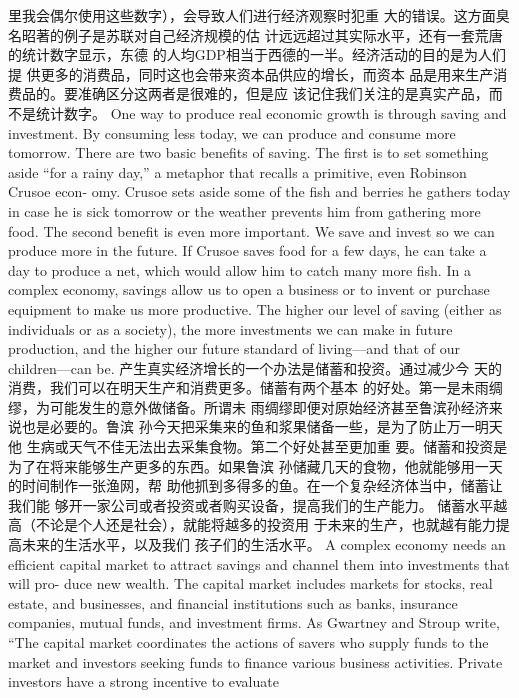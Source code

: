 \begin{paracol}{2}
里我会偶尔使用这些数字），会导致人们进行经济观察时犯重
大的错误。这方面臭名昭著的例子是苏联对自己经济规模的估
计远远超过其实际水平，还有一套荒唐的统计数字显示，东德
的人均GDP相当于西德的一半。经济活动的目的是为人们提
供更多的消费品，同时这也会带来资本品供应的增长，而资本
品是用来生产消费品的。要准确区分这两者是很难的，但是应
该记住我们关注的是真实产品，而不是统计数字。
\switchcolumn*
One way to produce real economic growth is through saving
and investment. By consuming less today, we can produce and
consume more tomorrow. There are two basic benefits of saving. The first is to set something aside ``for a rainy day,'' a
metaphor that recalls a primitive, even Robinson Crusoe econ-
omy. Crusoe sets aside some of the fish and berries he gathers
today in case he is sick tomorrow or the weather prevents him
from gathering more food. The second benefit is even more important. We save and invest so we can produce more in the future. If Crusoe saves food for a few days, he can take a day to
produce a net, which would allow him to catch many more fish.
In a complex economy, savings allow us to open a business or to
invent or purchase equipment to make us more productive. The
higher our level of saving (either as individuals or as a society),
the more investments we can make in future production, and
the higher our future standard of living---and that of our children---can be.
\switchcolumn
产生真实经济增长的一个办法是储蓄和投资。通过减少今
天的消费，我们可以在明天生产和消费更多。储蓄有两个基本
的好处。第一是未雨绸缪，为可能发生的意外做储备。所谓未
雨绸缪即便对原始经济甚至鲁滨孙经济来说也是必要的。鲁滨
孙今天把采集来的鱼和浆果储备一些，是为了防止万一明天他
生病或天气不佳无法出去采集食物。第二个好处甚至更加重
要。储蓄和投资是为了在将来能够生产更多的东西。如果鲁滨
孙储藏几天的食物，他就能够用一天的时间制作一张渔网，帮
助他抓到多得多的鱼。在一个复杂经济体当中，储蓄让我们能
够开一家公司或者投资或者购买设备，提高我们的生产能力。
储蓄水平越高（不论是个人还是社会），就能将越多的投资用
于未来的生产，也就越有能力提高未来的生活水平，以及我们
孩子们的生活水平。
\switchcolumn*
A complex economy needs an efficient capital market to attract savings and channel them into investments that will pro-
duce new wealth. The capital market includes markets for
stocks, real estate, and businesses, and financial institutions
such as banks, insurance companies, mutual funds, and investment firms. As Gwartney and Stroup write, ``The capital market coordinates the actions of savers who supply funds to the
market and investors seeking funds to finance various business
activities. Private investors have a strong incentive to evaluate

\end{paracol}
